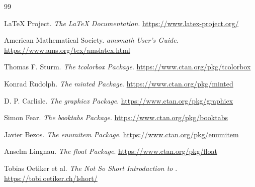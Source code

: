 \documentclass[graybox,envcountchap,sectrefs]{svmono}
\begin{document}
\newpage
\begin{thebibliography}{99}

 \LaTeX{} Project.
\newblock \emph{The \LaTeX{} Documentation}.
\newblock \url{https://www.latex-project.org/}

 American Mathematical Society.
\newblock \emph{amsmath User's Guide}.
\newblock \url{https://www.ams.org/tex/amslatex.html}

 Thomas F. Sturm.
\newblock \emph{The tcolorbox Package}.
\newblock \url{https://www.ctan.org/pkg/tcolorbox}

 Konrad Rudolph.
\newblock \emph{The minted Package}.
\newblock \url{https://www.ctan.org/pkg/minted}

 D. P. Carlisle.
\newblock \emph{The graphicx Package}.
\newblock \url{https://www.ctan.org/pkg/graphicx}

 Simon Fear.
\newblock \emph{The booktabs Package}.
\newblock \url{https://www.ctan.org/pkg/booktabs}

 Javier Bezos.
\newblock \emph{The enumitem Package}.
\newblock \url{https://www.ctan.org/pkg/enumitem}

 Anselm Lingnau.
\newblock \emph{The float Package}.
\newblock \url{https://www.ctan.org/pkg/float}

 Tobias Oetiker et al.
\newblock \emph{The Not So Short Introduction to \LaTeXe}.
\newblock \url{https://tobi.oetiker.ch/lshort/}

\end{thebibliography}
\end{document}
